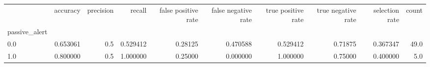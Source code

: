 \begin{tabular}{lrrrrrrrrr}
\toprule
{} &  accuracy &  precision &    recall &  false positive rate &  false negative rate &  true positive rate &  true negative rate &  selection rate &  count \\
passive\_alert &           &            &           &                      &                      &                     &                     &                 &        \\
\midrule
0.0           &  0.653061 &        0.5 &  0.529412 &              0.28125 &             0.470588 &            0.529412 &             0.71875 &        0.367347 &   49.0 \\
1.0           &  0.800000 &        0.5 &  1.000000 &              0.25000 &             0.000000 &            1.000000 &             0.75000 &        0.400000 &    5.0 \\
\bottomrule
\end{tabular}
